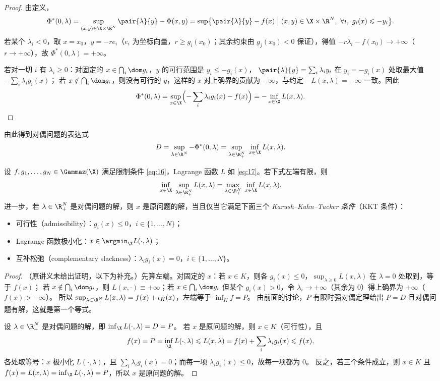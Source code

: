 \begin{proof}
由定义，
\[
  \Phi^*(0,\lambda)=\sup_{(x,y)\in\X\times\R^N}\pair{\lambda}{y}-\Phi(x,y)
  =\sup\bigl\{\pair{\lambda}{y}-f(x)\bigm|(x,y)\in\X\times\R^N,\ \forall i,\ g_i(x)\leqslant-y_i\bigr\}.
\]
若某个 $\lambda_i<0$，取 $x=x_0$，$y=-re_i$（$e_i$ 为坐标向量，$r\geqslant g_i(x_0)$；其余约束由 $g_j(x_0)<0$ 保证），得值
$-r\lambda_i-f(x_0)\to+\infty$（$r\to+\infty$），故 $\Phi^*(0,\lambda)=+\infty$。

若对一切 $i$ 有 $\lambda_i\geqslant0$：对固定的 $x\in\bigcap_i\dom g_i$，$y$ 的可行范围是 $y_i\leqslant-g_i(x)$，
$\pair{\lambda}{y}=\sum_i\lambda_iy_i$ 在 $y_i=-g_i(x)$ 处取最大值 $-\sum_i\lambda_ig_i(x)$；
若 $x\notin\bigcap_i\dom g_i$，则没有可行的 $y$，这样的 $x$ 对上确界的贡献为 $-\infty$，与约定 $-L(x,\lambda)=-\infty$ 一致。因此
\[
  \Phi^*(0,\lambda)=\sup_{x\in\X}\Bigl(-\sum_i\lambda_ig_i(x)-f(x)\Bigr)=-\inf_{x\in\X}L(x,\lambda).\qedhere
\]
\end{proof}

由此得到对偶问题的表达式
\[
  D=\sup_{\lambda\in\R^N}-\Phi^*(0,\lambda)=\sup_{\lambda\in\R^N_+}\ \inf_{x\in\X}L(x,\lambda).
\]

\begin{theorem}[Lagrange 对偶]
\label{res:67}
设 $f,g_1,\dots,g_N\in\Gammaz(\X)$ 满足限制条件 \eqref{eq:16}，Lagrange 函数 $L$ 如 \eqref{eq:17}。若下式左端有限，则
\[
  \inf_{x\in\X}\ \sup_{\lambda\in\R^N_+}L(x,\lambda)=\max_{\lambda\in\R^N_+}\ \inf_{x\in\X}L(x,\lambda).
\]
进一步，若 $\lambda\in\R^N_+$ 是对偶问题的解，则 $x$ 是原问题的解，当且仅当它满足下面三个 \emph{Karush--Kuhn--Tucker 条件}（KKT 条件）：
\begin{itemize}
  \item 可行性（admissibility）：$g_i(x)\leqslant0$，$i\in\{1,\dots,N\}$；
  \item Lagrange 函数极小化：$x\in\argmin_\X L(\cdot,\lambda)$；
  \item 互补松弛（complementary slackness）：$\lambda_ig_i(x)=0$，$i\in\{1,\dots,N\}$。
\end{itemize}
\end{theorem}

\begin{proof}
（原讲义未给出证明，以下为补充。）先算左端。对固定的 $x$：若 $x\in K$，则各 $g_i(x)\leqslant0$，$\sup_{\lambda\geqslant0}L(x,\lambda)$ 在 $\lambda=0$ 处取到，等于 $f(x)$；
若 $x\notin\bigcap_i\dom g_i$，则 $L(x,\cdot)\equiv+\infty$；若 $x\in\bigcap_i\dom g_i$ 但某个 $g_i(x)>0$，令 $\lambda_i\to+\infty$（其余为 $0$）得上确界为 $+\infty$（$f(x)>-\infty$）。
所以 $\sup_{\lambda\in\R^N_+}L(x,\lambda)=f(x)+\iota_K(x)$，左端等于 $\inf_Kf=P$。
由前面的讨论，$P$ 有限时强对偶定理给出 $P=D$ 且对偶问题有解，这就是第一个等式。

设 $\lambda\in\R^N_+$ 是对偶问题的解，即 $\inf_\X L(\cdot,\lambda)=D=P$。
若 $x$ 是原问题的解，则 $x\in K$（可行性），且
\[
  f(x)=P=\inf_\X L(\cdot,\lambda)\leqslant L(x,\lambda)=f(x)+\sum_i\lambda_ig_i(x)\leqslant f(x),
\]
各处取等号：$x$ 极小化 $L(\cdot,\lambda)$，且 $\sum_i\lambda_ig_i(x)=0$；而每一项 $\lambda_ig_i(x)\leqslant0$，故每一项都为 $0$。
反之，若三个条件成立，则 $x\in K$ 且 $f(x)=L(x,\lambda)=\inf_\X L(\cdot,\lambda)=P$，所以 $x$ 是原问题的解。
\end{proof}

